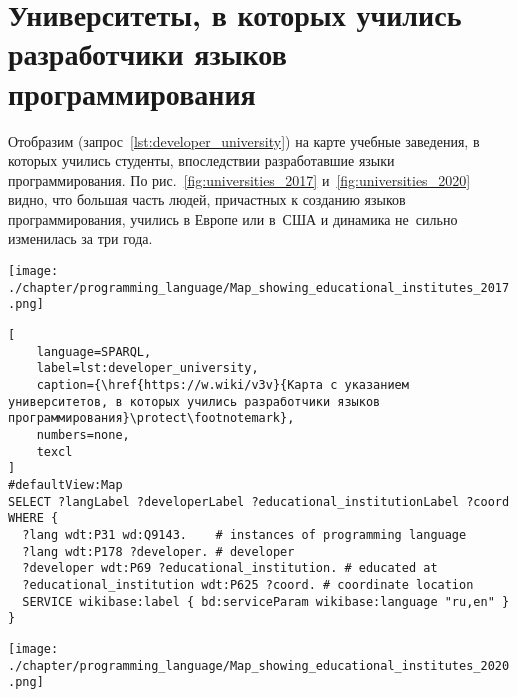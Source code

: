 \section{Университеты, в которых учились разработчики языков программирования}


Отобразим (запрос~\ref{lst:developer_university}) на карте учебные заведения, в которых учились студенты, впоследствии разработавшие языки программирования.
По рис.~\ref{fig:universities_2017} и~\ref{fig:universities_2020} видно, 
что большая часть людей, 
причастных к созданию языков программирования, 
учились в Европе или в~США и динамика не~сильно изменилась за три года.
%
\begin{marginfigure}[3\baselineskip]
\centering
	\texttt{[image: ./chapter/programming\_language/Map\_showing\_educational\_institutes\_2017.png]}
	\caption[Учебные заведения, в которых учились разработчики языков программирования, 2017 год.]{Учебные заведения, в которых учились разработчики языков программирования, 2017 год. Ссылка на SPARQL-запрос: \href{https://w.wiki/uGb}{https://w.wiki/uGb}}
	\label{fig:universities_2017}
\end{marginfigure}


\begin{lstlisting}[
	language=SPARQL,
	label=lst:developer_university,
	caption={\href{https://w.wiki/v3v}{Карта с указанием университетов, в которых учились разработчики языков программирования}\protect\footnotemark},
    numbers=none,
	texcl
]
#defaultView:Map
SELECT ?langLabel ?developerLabel ?educational_institutionLabel ?coord WHERE {
  ?lang wdt:P31 wd:Q9143.    # instances of programming language
  ?lang wdt:P178 ?developer. # developer
  ?developer wdt:P69 ?educational_institution. # educated at
  ?educational_institution wdt:P625 ?coord. # coordinate location
  SERVICE wikibase:label { bd:serviceParam wikibase:language "ru,en" }
}
\end{lstlisting}

\begin{marginfigure}[1\baselineskip]
\centering
	\texttt{[image: ./chapter/programming\_language/Map\_showing\_educational\_institutes\_2020.png]}
	\caption[Учебные заведения, в которых учились разработчики языков программирования, 2020 год.]{Учебные заведения, в которых учились разработчики языков программирования, 2020 год. Ссылка на SPARQL-запрос: \href{https://w.wiki/uGb}{https://w.wiki/uGb}}
	\label{fig:universities_2020}
\end{marginfigure}



